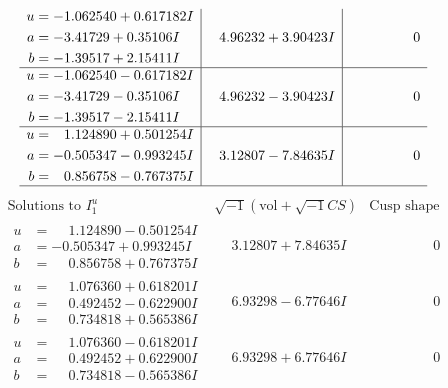 \documentclass[1p]{elsarticle_modified}
\theoremstyle{definition}
\newcommand{\I}{\sqrt{-1}}
\begin{document}
$$\begin{array}{c|c|c}
\begin{aligned}
u &= -1.062540 + 0.617182 I \\
a &= -3.41729 + 0.35106 I \\
b &= -1.39517 + 2.15411 I\end{aligned}
 & \phantom{-}4.96232 + 3.90423 I & \phantom{-0.000000 } 0 \\ \hline\begin{aligned}
u &= -1.062540 - 0.617182 I \\
a &= -3.41729 - 0.35106 I \\
b &= -1.39517 - 2.15411 I\end{aligned}
 & \phantom{-}4.96232 - 3.90423 I & \phantom{-0.000000 } 0 \\ \hline\begin{aligned}
u &= \phantom{-}1.124890 + 0.501254 I \\
a &= -0.505347 - 0.993245 I \\
b &= \phantom{-}0.856758 - 0.767375 I\end{aligned}
 & \phantom{-}3.12807 - 7.84635 I & \phantom{-0.000000 } 0\\
 \hline 
 \end{array}$$\newpage$$\begin{array}{c|c|c}  
\text{Solutions to }I^u_{1}& \I (\text{vol} + \sqrt{-1}CS) & \text{Cusp shape}\\
 \hline 
\begin{aligned}
u &= \phantom{-}1.124890 - 0.501254 I \\
a &= -0.505347 + 0.993245 I \\
b &= \phantom{-}0.856758 + 0.767375 I\end{aligned}
 & \phantom{-}3.12807 + 7.84635 I & \phantom{-0.000000 } 0 \\ \hline\begin{aligned}
u &= \phantom{-}1.076360 + 0.618201 I \\
a &= \phantom{-}0.492452 - 0.622900 I \\
b &= \phantom{-}0.734818 + 0.565386 I\end{aligned}
 & \phantom{-}6.93298 - 6.77646 I & \phantom{-0.000000 } 0 \\ \hline\begin{aligned}
u &= \phantom{-}1.076360 - 0.618201 I \\
a &= \phantom{-}0.492452 + 0.622900 I \\
b &= \phantom{-}0.734818 - 0.565386 I\end{aligned}
 & \phantom{-}6.93298 + 6.77646 I & \phantom{-0.000000 } 0 \\ \hline\begin{aligned}

\end{aligned}
\end{array}$$
\end{document}
